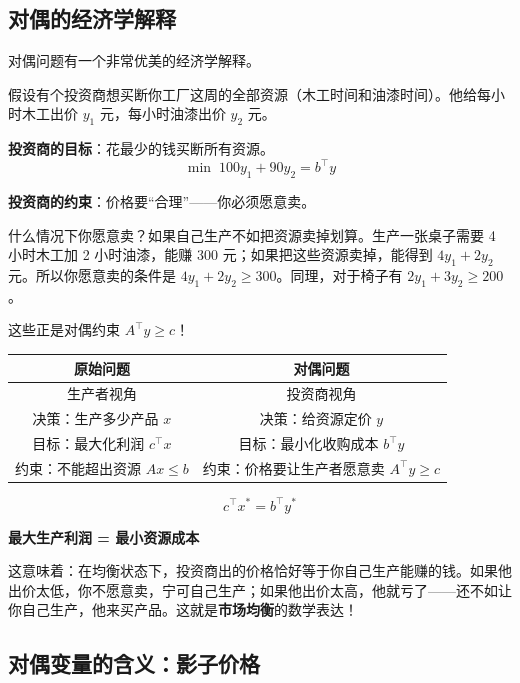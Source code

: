 \subsection{对偶的经济学解释}

对偶问题有一个非常优美的经济学解释。

\begin{example}[回到家具厂]
假设有个投资商想买断你工厂这周的全部资源（木工时间和油漆时间）。他给每小时木工出价 $y_1$ 元，每小时油漆出价 $y_2$ 元。

\textbf{投资商的目标}：花最少的钱买断所有资源。
\[
\min \; 100 y_1 + 90 y_2 = b^\top y
\]

\textbf{投资商的约束}：价格要“合理”——你必须愿意卖。

什么情况下你愿意卖？如果自己生产不如把资源卖掉划算。生产一张桌子需要 4 小时木工加 2 小时油漆，能赚 300 元；如果把这些资源卖掉，能得到 $4y_1 + 2y_2$ 元。所以你愿意卖的条件是 $4y_1 + 2y_2 \geq 300$。同理，对于椅子有 $2y_1 + 3y_2 \geq 200$。

这些正是对偶约束 $A^\top y \geq c$！
\end{example}

\begin{center}
\renewcommand{\arraystretch}{1.4}
\begin{tabular}{c|c}
\toprule
\textbf{原始问题} & \textbf{对偶问题} \\
\midrule
生产者视角 & 投资商视角 \\
\midrule
决策：生产多少产品 $x$ & 决策：给资源定价 $y$ \\
\midrule
目标：最大化利润 $c^\top x$ & 目标：最小化收购成本 $b^\top y$ \\
\midrule
约束：不能超出资源 $Ax \leq b$ & 约束：价格要让生产者愿意卖 $A^\top y \geq c$ \\
\bottomrule
\end{tabular}
\end{center}

\begin{keytheorem}[title=强对偶的经济学意义]
\[
c^\top x^* = b^\top y^*
\]

\textbf{最大生产利润 = 最小资源成本}

这意味着：在均衡状态下，投资商出的价格恰好等于你自己生产能赚的钱。如果他出价太低，你不愿意卖，宁可自己生产；如果他出价太高，他就亏了——还不如让你自己生产，他来买产品。这就是\textbf{市场均衡}的数学表达！
\end{keytheorem}

\subsection{对偶变量的含义：影子价格}

